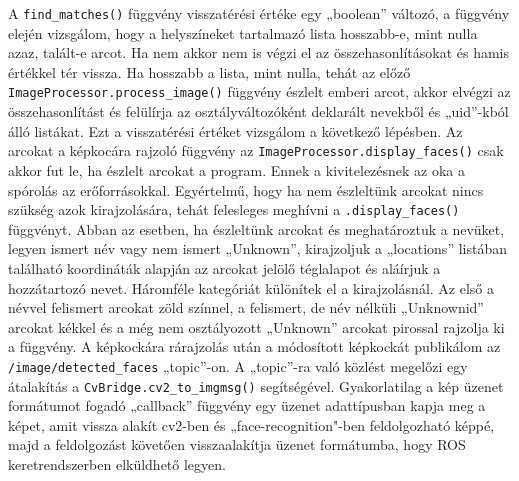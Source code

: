 A \verb|find_matches()| függvény visszatérési értéke egy „boolean” változó, a függvény elején vizsgálom, hogy a helyszíneket tartalmazó lista hosszabb-e, mint nulla azaz, talált-e arcot. Ha nem akkor nem is végzi el az összehasonlításokat és hamis értékkel tér vissza. Ha hosszabb a lista, mint nulla, tehát az előző \verb|ImageProcessor.process_image()| függvény észlelt emberi arcot, akkor elvégzi az összehasonlítást és felülírja az osztályváltozóként deklarált nevekből és „uid”-kból álló listákat. Ezt a visszatérési értéket vizsgálom a következő lépésben. Az arcokat a képkocára rajzoló függvény az \verb|ImageProcessor.display_faces()| csak akkor fut le, ha észlelt arcokat a program. Ennek a kivitelezésnek az oka a spórolás az erőforrásokkal. Egyértelmű, hogy ha nem észleltünk arcokat nincs szükség azok kirajzolására, tehát felesleges meghívni a \verb|.display_faces()| függvényt. Abban az esetben, ha észleltünk arcokat és meghatároztuk a nevüket, legyen ismert név vagy nem ismert „Unknown”, kirajzoljuk a „locations” listában található koordináták alapján az arcokat jelölő téglalapot és aláírjuk a hozzátartozó nevet. Háromféle kategóriát különítek el a kirajzolásnál. Az első a névvel felismert arcokat  zöld színnel, a felismert, de név nélküli „Unknown\textunderscore id” arcokat kékkel és a még nem osztályozott „Unknown” arcokat pirossal rajzolja ki a függvény. A képkockára rárajzolás után a módosított képkockát publikálom az \verb|/image/detected_faces| „topic”-on. A „topic”-ra való közlést megelőzi egy átalakítás a \verb|CvBridge.cv2_to_imgmsg()| segítségével. Gyakorlatilag a kép üzenet formátumot fogadó „callback” függvény egy üzenet adattípusban kapja meg a képet, amit vissza alakít cv2-ben és „face-recognition"-ben feldolgozható képpé, majd a feldolgozást követően visszaalakítja üzenet formátumba, hogy ROS keretrendszerben elküldhető legyen.

